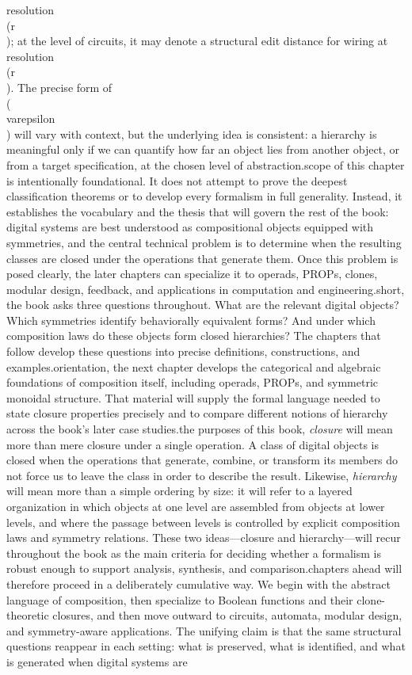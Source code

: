 resolution \\(r\\); at the level of circuits, it may denote a structural edit distance for wiring at resolution \\(r\\). The precise form of \\(\\varepsilon\\) will vary with context, but the underlying idea is consistent: a hierarchy is meaningful only if we can quantify how far an object lies from another object, or from a target specification, at the chosen level of abstraction.\n\nThe scope of this chapter is intentionally foundational. It does not attempt to prove the deepest classification theorems or to develop every formalism in full generality. Instead, it establishes the vocabulary and the thesis that will govern the rest of the book: digital systems are best understood as compositional objects equipped with symmetries, and the central technical problem is to determine when the resulting classes are closed under the operations that generate them. Once this problem is posed clearly, the later chapters can specialize it to operads, PROPs, clones, modular design, feedback, and applications in computation and engineering.\n\nIn short, the book asks three questions throughout. What are the relevant digital objects? Which symmetries identify behaviorally equivalent forms? And under which composition laws do these objects form closed hierarchies? The chapters that follow develop these questions into precise definitions, constructions, and examples.\n\nFor orientation, the next chapter develops the categorical and algebraic foundations of composition itself, including operads, PROPs, and symmetric monoidal structure. That material will supply the formal language needed to state closure properties precisely and to compare different notions of hierarchy across the book's later case studies.\n\nFor the purposes of this book, \emph{closure} will mean more than mere closure under a single operation. A class of digital objects is closed when the operations that generate, combine, or transform its members do not force us to leave the class in order to describe the result. Likewise, \emph{hierarchy} will mean more than a simple ordering by size: it will refer to a layered organization in which objects at one level are assembled from objects at lower levels, and where the passage between levels is controlled by explicit composition laws and symmetry relations. These two ideas---closure and hierarchy---will recur throughout the book as the main criteria for deciding whether a formalism is robust enough to support analysis, synthesis, and comparison.\n\nThe chapters ahead will therefore proceed in a deliberately cumulative way. We begin with the abstract language of composition, then specialize to Boolean functions and their clone-theoretic closures, and then move outward to circuits, automata, modular design, and symmetry-aware applications. The unifying claim is that the same structural questions reappear in each setting: what is preserved, what is identified, and what is generated when digital systems are 